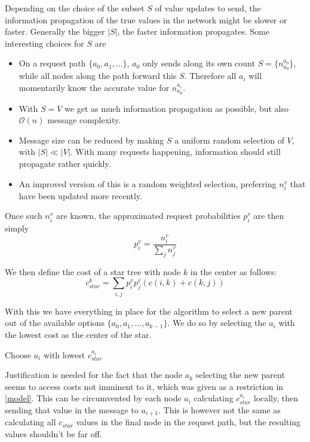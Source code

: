 \documentclass[a4paper, oneside]{discothesis}
\begin{document}
Depending on the choice of the subset $S$ of value updates to send, the information propagation of the true values in the network might be slower or faster. Generally the bigger $|S|$, the faster information propagates. Some interesting choices for $S$ are
\begin{itemize}
\item On a request path $\{a_0,a_1,\dots\}$, $a_0$ only sends along its own count $S=\{n_{a_0}^{a_0}\}$, while all nodes along the path forward this $S$. Therefore all $a_i$ will momentarily know the accurate value for $n_{a_0}^{a_i}$.
\item With $S=V$ we get as much information propagation as possible, but also $\mathcal{O}(n)$ message complexity.
\item Message size can be reduced by making $S$ a uniform random selection of $V$, with $|S|\ll|V|$. With many requests happening, information should still propagate rather quickly.
\item An improved version of this is a random weighted selection, preferring $n_i^v$ that have been updated more recently.
\end{itemize}

Once such $n_i^v$ are known, the approximated request probabilities $p_i^v$ are then simply
\begin{equation}
p_i^v=\frac{n_i^v}{\sum_jn_j^v}
\end{equation}

We then define the cost of a star tree with node $k$ in the center as follows:
\begin{equation}
c_{star}^k=\sum_{i,j}p_i^vp_j^v(c(i, k)+c(k,j))
\end{equation}

With this we have everything in place for the algorithm to select a new parent out of the available options $\{a_0,a_1,\dots,a_{k-1}\}$. We do so by selecting the $a_i$ with the lowest cost as the center of the star.

\begin{algorithmic}
\State\Return Choose $a_i$ with lowest $c_{star}^{a_i}$
\EndFunction
\end{algorithmic}

Justification is needed for the fact that the node $a_k$ selecting the new parent seems to access costs not imminent to it, which was given as a restriction in \ref{model}. This can be circumvented by each node $a_i$ calculating $c_{star}^{a_i}$ locally, then sending that value in the message to $a_{i+1}$. This is however not the same as calculating all $c_{star}$ values in the final node in the request path, but the resulting values shouldn't be far off.
\end{document}
